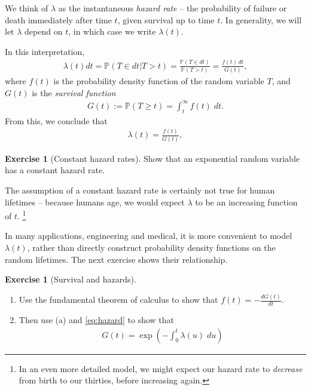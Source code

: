 \documentclass[11pt]{article}
\theoremstyle{definition}
\newtheorem{exercise}[]{Exercise}
\renewcommand{\P}{\mathbb{P}}
\begin{document}
We think of $\lambda$ as the instantaneous \textit{hazard rate} --
the probability of failure or death immediately after time $t$, given survival up to
time $t$. In generality, we will let $\lambda$ depend on $t$,
in which case we write $\lambda(t)$.

In this interpretation,
\begin{align*}
\lambda(t) dt  = \P(T\in dt | T > t) = \frac{\P(T \in dt)}{\P(T > t)} =
\frac{f(t) \, dt}{G(t)},
\end{align*}
where $f(t)$ is the probability density function of the random variable $T$,
and $G(t)$ is the \textit{survival function}
\begin{align*}
G(t) := \P(T \geq t) = \int_{t}^\infty f(t)\; dt.
\end{align*}
From this, we conclude that
\begin{align}
  \lambda(t) = \frac{f(t)}{G(t)},
  \label{eq:hazard}
\end{align}

\begin{exercise}[Constant hazard rates]
Show that an exponential random variable has a constant hazard rate.
\end{exercise}

The assumption of a constant hazard rate is certainly not true
for human lifetimes -- because humans age,
we would expect $\lambda$ to be an increasing function of $t$.
\footnote{In an even more detailed model, we might
expect our hazard rate to \textit{decrease} from birth to our thirties,
before increasing again. }

In many applications, engineering and medical, it is more
convenient to model
$\lambda(t)$, rather than directly construct probability density functions
on the random lifetimes.
The next exercise shows their relationship.

\begin{exercise}[Survival and hazards]

$\quad$

\begin{enumerate}[label=(\alph*)]
  \item Use the fundamental theorem of calculus to show that
  $f(t) = -\frac{dG(t)}{dt}$.
  \item Then use (a) and \eqref{eq:hazard} to show that
  \begin{align*}
    G(t) = \exp\left(-\int_0^t\lambda(u)\;du\right)
  \end{align*}
\end{enumerate}

\end{exercise}
\end{document}
